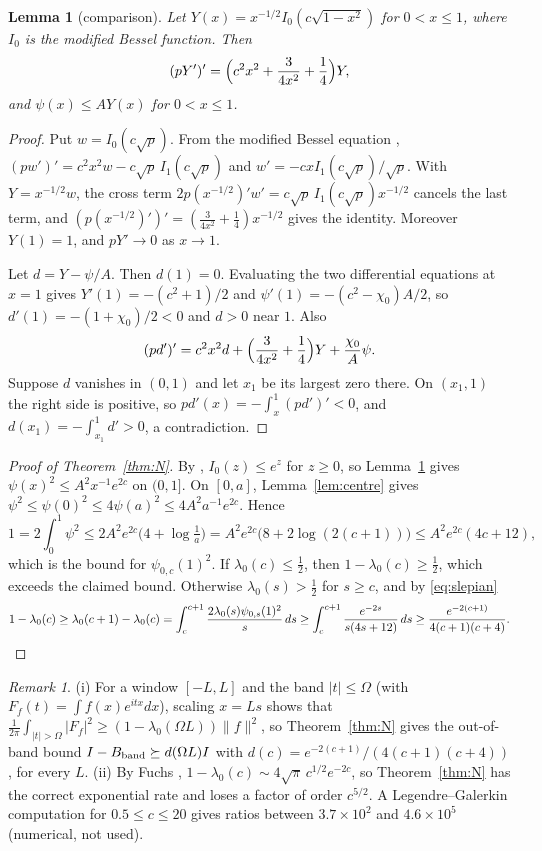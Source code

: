 \documentclass[11pt]{amsart}
\newtheorem{lemma}[proposition]{Lemma}
\theoremstyle{remark}
\newtheorem{remark}[proposition]{Remark}
\numberwithin{equation}{section}
\begin{document}
\begin{lemma}[comparison]\label{lem:comparison}
Let $Y(x)=x^{-1/2}I_0(c\sqrt{1-x^2})$ for $0<x\le1$, where $I_0$ is the modified Bessel function. Then
\[
(pY')'=\Bigl(c^2x^2+\frac3{4x^2}+\frac14\Bigr)Y,
\]
and $\psi(x)\le AY(x)$ for $0<x\le1$.
\end{lemma}
\begin{proof}
Put $w=I_0(c\sqrt p)$. From the modified Bessel equation \cite[10.25.1]{DLMF}, $(pw')'=c^2x^2w-c\sqrt p\,I_1(c\sqrt p)$ and $w'=-cxI_1(c\sqrt p)/\sqrt p$. With $Y=x^{-1/2}w$, the cross term $2p(x^{-1/2})'w'=c\sqrt p\,I_1(c\sqrt p)x^{-1/2}$ cancels the last term, and $(p(x^{-1/2})')'=(\frac3{4x^2}+\frac14)x^{-1/2}$ gives the identity. Moreover $Y(1)=1$, and $pY'\to0$ as $x\to1$.

Let $d=Y-\psi/A$. Then $d(1)=0$. Evaluating the two differential equations at $x=1$ gives $Y'(1)=-(c^2+1)/2$ and $\psi'(1)=-(c^2-\chi_0)A/2$, so $d'(1)=-(1+\chi_0)/2<0$ and $d>0$ near $1$. Also
\[
(pd')'=c^2x^2d+\Bigl(\frac3{4x^2}+\frac14\Bigr)Y+\frac{\chi_0}A\psi .
\]
Suppose $d$ vanishes in $(0,1)$ and let $x_1$ be its largest zero there. On $(x_1,1)$ the right side is positive, so $pd'(x)=-\int_x^1(pd')'<0$, and $d(x_1)=-\int_{x_1}^1d'>0$, a contradiction.
\end{proof}

\begin{proof}[Proof of Theorem~\ref{thm:N}]
By \cite[10.32.1]{DLMF}, $I_0(z)\le e^z$ for $z\ge0$, so Lemma~\ref{lem:comparison} gives $\psi(x)^2\le A^2x^{-1}e^{2c}$ on $(0,1]$. On $[0,a]$, Lemma~\ref{lem:centre} gives $\psi^2\le\psi(0)^2\le4\psi(a)^2\le4A^2a^{-1}e^{2c}$. Hence
\[
1=2\int_0^1\psi^2\le2A^2e^{2c}\bigl(4+\log\tfrac1a\bigr)=A^2e^{2c}\bigl(8+2\log(2(c+1))\bigr)\le A^2e^{2c}(4c+12),
\]
which is the bound for $\psi_{0,c}(1)^2$. If $\lambda_0(c)\le\frac12$, then $1-\lambda_0(c)\ge\frac12$, which exceeds the claimed bound. Otherwise $\lambda_0(s)>\frac12$ for $s\ge c$, and by \eqref{eq:slepian}
\[
1-\lambda_0(c)\ge\lambda_0(c+1)-\lambda_0(c)=\int_c^{c+1}\frac{2\lambda_0(s)\psi_{0,s}(1)^2}s\,ds\ge\int_c^{c+1}\frac{e^{-2s}}{s(4s+12)}\,ds\ge\frac{e^{-2(c+1)}}{4(c+1)(c+4)} .
\qedhere
\]
\end{proof}

\begin{remark}\label{rem:scaling}
(i) For a window $[-L,L]$ and the band $|t|\le\Omega$ (with $F_f(t)=\int f(x)e^{itx}dx$), scaling $x=Ls$ shows that $\frac1{2\pi}\int_{|t|>\Omega}|F_f|^2\ge(1-\lambda_0(\Omega L))\|f\|^2$, so Theorem~\ref{thm:N} gives the out-of-band bound $I-B_{\rm band}\succeq d(\Omega L)I$ with $d(c)=e^{-2(c+1)}/(4(c+1)(c+4))$, for every $L$.
(ii) By Fuchs \cite{Fuchs64}, $1-\lambda_0(c)\sim4\sqrt\pi\,c^{1/2}e^{-2c}$, so Theorem~\ref{thm:N} has the correct exponential rate and loses a factor of order $c^{5/2}$. A Legendre--Galerkin computation for $0.5\le c\le20$ gives ratios between $3.7\times10^2$ and $4.6\times10^5$ (numerical, not used).
\end{remark}
\end{document}
